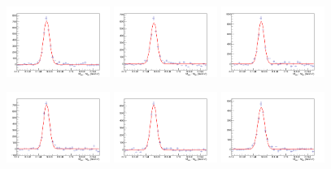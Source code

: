 \begin{figure}[!h]
\begin{center}
\includegraphics[width=0.3\textwidth]{figures/Dstar/pp13TeV/multi_trial/residual_plot_Pow_bkg_func_4-4dot5GeV.png} 
\includegraphics[width=0.3\textwidth]{figures/Dstar/pp13TeV/multi_trial/residual_plot_Pow_bkg_func_4dot5-5GeV.png}
\includegraphics[width=0.3\textwidth]{figures/Dstar/pp13TeV/multi_trial/residual_plot_Pow_bkg_func_5-5dot5GeV.png} 

\includegraphics[width=0.3\textwidth]{figures/Dstar/pp13TeV/multi_trial/residual_plot_Pow_bkg_func_5dot5-6GeV.png} 
\includegraphics[width=0.3\textwidth]{figures/Dstar/pp13TeV/multi_trial/residual_plot_Pow_bkg_func_6-6dot5GeV.png}
\includegraphics[width=0.3\textwidth]{figures/Dstar/pp13TeV/multi_trial/residual_plot_Pow_bkg_func_6dot5-7GeV.png} 


\end{center}
\end{figure}
